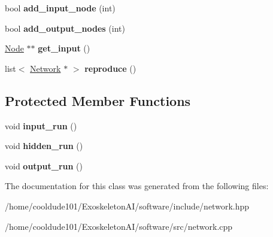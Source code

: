 \begin{DoxyCompactItemize}
\item 
bool {\bfseries add\+\_\+input\+\_\+node} (int)\hypertarget{classNetwork_ac4d29c89c06f55098999471122b59aa6}{}\label{classNetwork_ac4d29c89c06f55098999471122b59aa6}

\item 
bool {\bfseries add\+\_\+output\+\_\+nodes} (int)\hypertarget{classNetwork_afc1d4dede901a9d460d27b375fc9dbe3}{}\label{classNetwork_afc1d4dede901a9d460d27b375fc9dbe3}

\item 
\hyperlink{classNode}{Node} $\ast$$\ast$ {\bfseries get\+\_\+input} ()\hypertarget{classNetwork_aadab36fc34afd1d91c3f3d8913cb8658}{}\label{classNetwork_aadab36fc34afd1d91c3f3d8913cb8658}

\item 
list$<$ \hyperlink{classNetwork}{Network} $\ast$ $>$ {\bfseries reproduce} ()\hypertarget{classNetwork_ab83f0436ecdca3c30586d8a227077679}{}\label{classNetwork_ab83f0436ecdca3c30586d8a227077679}

\end{DoxyCompactItemize}
\subsection*{Protected Member Functions}
\begin{DoxyCompactItemize}
\item 
void {\bfseries input\+\_\+run} ()\hypertarget{classNetwork_ab86fd33a8f5a6eeb4536fedcc9303d36}{}\label{classNetwork_ab86fd33a8f5a6eeb4536fedcc9303d36}

\item 
void {\bfseries hidden\+\_\+run} ()\hypertarget{classNetwork_aed28978ec567d20480990b8d8391bb3a}{}\label{classNetwork_aed28978ec567d20480990b8d8391bb3a}

\item 
void {\bfseries output\+\_\+run} ()\hypertarget{classNetwork_a4bf0d1ed13ea2e8d09072809655e1727}{}\label{classNetwork_a4bf0d1ed13ea2e8d09072809655e1727}

\end{DoxyCompactItemize}


The documentation for this class was generated from the following files\+:\begin{DoxyCompactItemize}
\item 
/home/cooldude101/\+Exoskeleton\+A\+I/software/include/network.\+hpp\item 
/home/cooldude101/\+Exoskeleton\+A\+I/software/src/network.\+cpp\end{DoxyCompactItemize}
